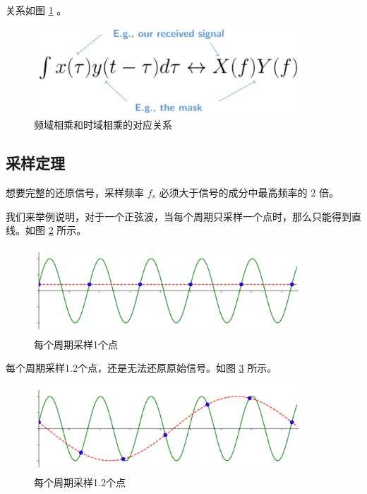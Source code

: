 \documentclass[lang=cn,newtx,10pt,scheme=chinese]{elegantbook}
\begin{document}
关系如图 \ref{fig:xfyf} 。

\begin{figure}[!htb]
\centering
\includegraphics[width=0.9\textwidth]{xfyf.pdf}
\caption{频域相乘和时域相乘的对应关系}
\label{fig:xfyf}
\end{figure}

\subsection{采样定理}

\begin{theorem}[采样定理]
    想要完整的还原信号，采样频率 $f_s$ 必须大于信号的成分中最高频率的 2 倍。
\end{theorem}

我们来举例说明，对于一个正弦波，当每个周期只采样一个点时，那么只能得到直线。如图 \ref{fig:sampling_Fs_0.3} 所示。

\begin{figure}[!htb]
\centering
\includegraphics[width=0.9\textwidth]{sampling_Fs_0.3.pdf}
\caption{每个周期采样1个点}
\label{fig:sampling_Fs_0.3}
\end{figure}

每个周期采样1.2个点，还是无法还原原始信号。如图 \ref{fig:sampling_Fs_0.36} 所示。

\begin{figure}[!htb]
\centering
\includegraphics[width=0.9\textwidth]{sampling_Fs_0.36.pdf}
\caption{每个周期采样1.2个点}
\label{fig:sampling_Fs_0.36}
\end{figure}
\end{document}
